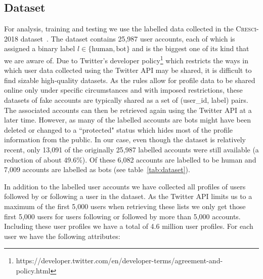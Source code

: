 \subsection{Dataset}
For analysis, training and testing we use the labelled data collected in the \textsc{Cresci-2018} dataset~\cite{cresci2018fake}. The dataset contains 25,987 user accounts, each of which is assigned a binary label $l \in \{\text{human},\text{bot}\}$ and is the biggest one of its kind that we are aware of. Due to Twitter's developer policy\footnote{https://developer.twitter.com/en/developer-terms/agreement-and-policy.html} which restricts the ways in which user data collected using the Twitter API may be shared, it is difficult to find sizable high-quality datasets. As the rules allow for profile data to be shared online only under specific circumstances and with imposed restrictions, these datasets of fake accounts are typically shared as a set of (user\_id, label) pairs. The associated accounts can then be retrieved again using the Twitter API at a later time. However, as many of the labelled accounts are bots might have been deleted or changed to a ``protected" status which hides most of the profile information from the public. In our case, even though the dataset is relatively recent, only 13,091 of the originally 25,987 labelled accounts were still available (a reduction of about 49.6\%). Of these 6,082 accounts are labelled to be human and 7,009 accounts are labelled as bots (see table~\ref{tab:dataset}).


In addition to the labelled user accounts we have collected all profiles of users followed by or following a user in the dataset. As the Twitter API limits us to a maximum of the first 5,000 users when retrieving these lists we only get those first 5,000 users for users following or followed by more than 5,000 accounts. Including these user profiles we have a total of 4.6 million user profiles. For each user we have the following attributes:


